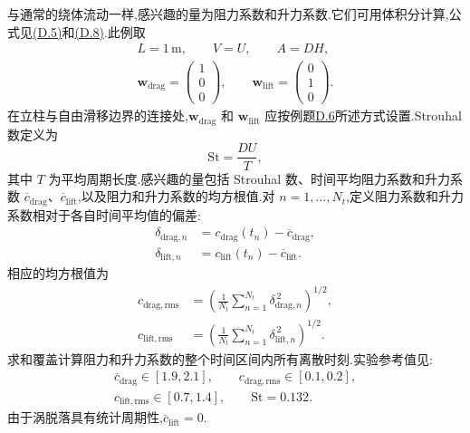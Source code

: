 \begin{example}[正方形截面柱绕流,$\mathrm{Re}=22000$]
与通常的绕体流动一样,感兴趣的量为阻力系数和升力系数.它们可用体积分计算,公式见\hyperref[eq:appendix-d-5]{(D.5)}和\hyperref[eq:appendix-d-8]{(D.8)}.此例取
\[
\begin{aligned}
L=1\,\mathrm m,\qquad V=U,\qquad A=DH,\\
\bm w_{\mathrm{drag}}=\begin{pmatrix}1\\0\\0\end{pmatrix},
\qquad
\bm w_{\mathrm{lift}}=\begin{pmatrix}0\\1\\0\end{pmatrix}.
\end{aligned}
\]
在立柱与自由滑移边界的连接处,$\bm w_{\mathrm{drag}}$ 和 $\bm w_{\mathrm{lift}}$ 应按例题\hyperref[ex:appendix-d-6]{D.6}所述方式设置.Strouhal 数定义为
\[
\mathrm{St}=\frac{DU}{T},
\]
其中 $T$ 为平均周期长度.感兴趣的量包括 Strouhal 数、时间平均阻力系数和升力系数 $\overline{c}_{\mathrm{drag}}$、$\overline{c}_{\mathrm{lift}}$,以及阻力和升力系数的均方根值.对 $n=1,\ldots,N_t$,定义阻力系数和升力系数相对于各自时间平均值的偏差:
\[
\begin{aligned}
\delta_{\mathrm{drag},n}&=c_{\mathrm{drag}}(t_n)-\overline c_{\mathrm{drag}},\\
\delta_{\mathrm{lift},n}&=c_{\mathrm{lift}}(t_n)-\overline c_{\mathrm{lift}}.
\end{aligned}
\]
相应的均方根值为
\[
\begin{aligned}
c_{\mathrm{drag,rms}}&=\left(\frac1{N_t}\sum_{n=1}^{N_t}\delta_{\mathrm{drag},n}^{\,2}\right)^{1/2},\\
c_{\mathrm{lift,rms}}&=\left(\frac1{N_t}\sum_{n=1}^{N_t}\delta_{\mathrm{lift},n}^{\,2}\right)^{1/2}.
\end{aligned}
\]
求和覆盖计算阻力和升力系数的整个时间区间内所有离散时刻.实验参考值见\textcite{Rodi1997}:
\[
\begin{aligned}
\overline c_{\mathrm{drag}}\in[1.9,2.1],\qquad
c_{\mathrm{drag,rms}}\in[0.1,0.2],\\
c_{\mathrm{lift,rms}}\in[0.7,1.4],\qquad
\mathrm{St}=0.132.
\end{aligned}
\]
由于涡脱落具有统计周期性,$\overline c_{\mathrm{lift}}=0$.
\end{example}

